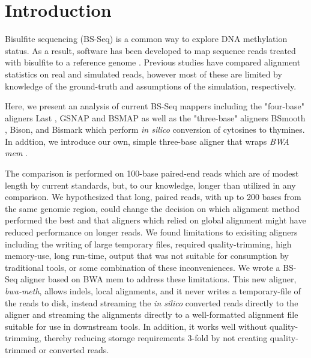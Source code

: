 \documentclass{bioinfo}
\begin{document}
\section{Introduction}
Bisulfite sequencing (BS-Seq) is a common way to explore DNA methylation status.
As a result, software 
has been developed to map sequence reads treated with bisulfite to a reference genome \citep{frithlast,methylcoder,gsnap,krueger2011,bsmap,bsmooth}.
Previous studies have compared alignment statistics on 
real \citep{methylcoder,bsmap,shrestha} and simulated \citep{frithlast} reads,
however most of these are limited by knowledge of the ground-truth and assumptions of
the simulation, respectively.

Here, we present an analysis of current BS-Seq mappers including the "four-base" aligners
Last \citep{frithlast}, GSNAP \citep{gsnap} and BSMAP \citep{bsmap} as well as the
"three-base" aligners BSmooth \citep{bsmooth}, Bison, and Bismark \citep{krueger2011} which
perform \emph{in silico} conversion of cytosines to thymines. In addtion, we introduce our
own, simple three-base aligner that wraps \textit{BWA mem} \citep{bwamem}.

The comparison is performed on 100-base paired-end reads
which are of modest length by current standards, but, to our knowledge, longer than
utilized in any comparison. We hypothesized that long, paired reads, with up
to 200 bases from the same genomic region, could change the decision on which
alignment method performed the best and that aligners which relied on global
alignment might have reduced performance on longer reads.
We found limitations to exisiting aligners including the writing of large temporary
files, required quality-trimming, high memory-use, long run-time, output that was not
suitable for consumption by traditional tools, or some combination of these
inconveniences. We wrote
a BS-Seq aligner based on BWA mem \citep{bwamem} to address these
limitations. This new aligner, 
\textit{bwa-meth}, allows indels, local alignments, and it never writes a
temporary-file of the reads to disk, instead streaming the \emph{in silico} converted
reads directly to the aligner and streaming the alignments directly to a well-formatted
alignment file suitable for use in downstream tools. In addition, it works well without
quality-trimming, thereby reducing storage requirements 3-fold by not creating
quality-trimmed or converted reads.
\end{document}
